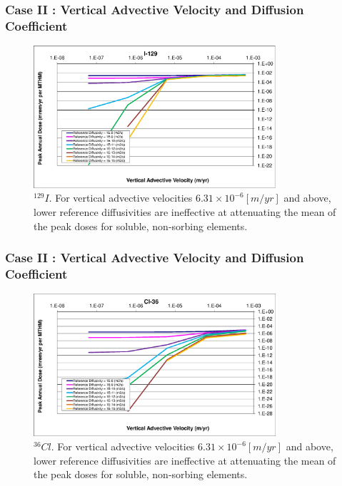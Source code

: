 \begin{frame}[c]
  \frametitle{Case II : Vertical Advective Velocity and Diffusion Coefficient}

\begin{figure}[ht!]
\centering
\includegraphics[width=0.8\textwidth]{AdvVelAndDiffCoeffEBSFail/I-129-VAdvVel.eps}
\caption{$^{129}I$.
For vertical advective velocities 
$6.31\times10^{-6}[m/yr]$ and above, lower reference diffusivities are 
ineffective at attenuating the mean of the peak doses for soluble, non-sorbing 
elements. 
}
\label{fig:VAdvVelI129VAdvVel}
\end{figure}
\end{frame}



\begin{frame}[c]
  \frametitle{Case II : Vertical Advective Velocity and Diffusion Coefficient}
\begin{figure}[ht!]
\centering
\includegraphics[width=0.8\textwidth]{AdvVelAndDiffCoeffEBSFail/Cl-36-VAdvVel.eps}
\caption{$^{36}Cl$.
For vertical advective velocities 
$6.31\times10^{-6}[m/yr]$ and above, lower reference diffusivities are 
ineffective at attenuating the mean of the peak doses for soluble, non-sorbing 
elements. 
}
\label{fig:VAdvVelCl36VAdvVel}
\end{figure}
\end{frame}

